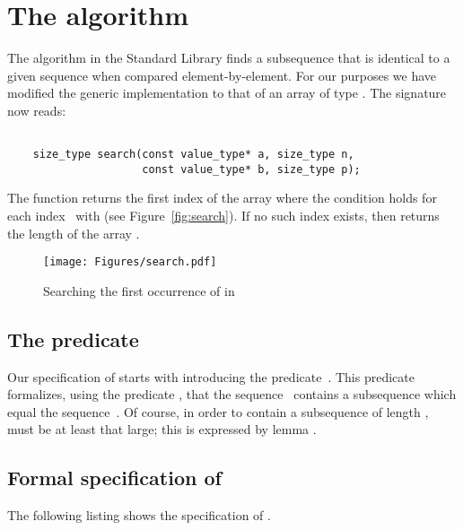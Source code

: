 
\section{The \search algorithm}

The \search algorithm in the \cxx Standard Library \cite[\S
28.5.13]{cxx-17-draft} finds a
subsequence that is identical to a given sequence when 
compared element-by-element.
For our purposes we have modified
the generic implementation
to that of an array of type .
The signature now reads:

\begin{lstlisting}[style = acsl-block]

    size_type search(const value_type* a, size_type n,
                     const value_type* b, size_type p);
\end{lstlisting}

The function \search returns the first
index  of the array  where the condition  holds for each
index~ with 
(see Figure~\ref{fig:search}).
If no such index exists, then \search returns the length
 of the array .

\begin{figure}[hbt]
\centering
\texttt{[image: Figures/search.pdf]}
\caption{ Searching the first occurrence of  in }
\end{figure}


\subsection{The predicate \HasSubRange}

Our specification of \search starts with introducing the
predicate~.
This predicate formalizes, using the predicate ,
that the sequence~ contains a subsequence which equal the sequence~.
Of course, in order to contain a subsequence of length ,
 must be at least that large; this is expressed by lemma 
\HasSubRangeSizes.



\subsection{Formal specification of \search}

The following listing shows the specification of .

